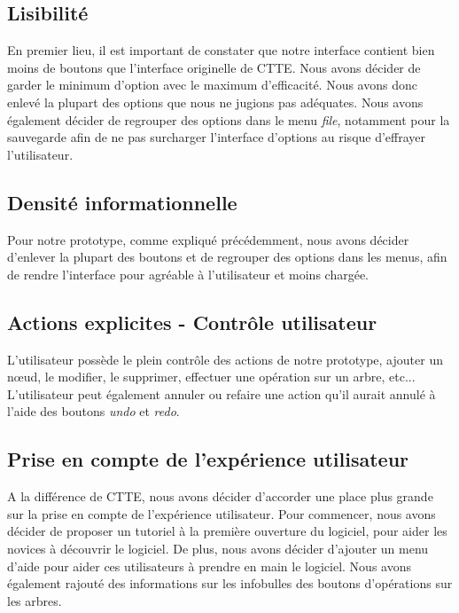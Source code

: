\documentclass[12pt, a4paper]{article}
\begin{document}
\textcolor{NavyBlue}{\subsection{Lisibilité}}

En premier lieu, il est important de constater que notre interface contient bien moins de boutons que l'interface originelle de CTTE. Nous avons décider de garder le minimum d'option avec le maximum d'efficacité. Nous avons donc enlevé la plupart des options que nous ne jugions pas adéquates. Nous avons également décider de regrouper des options dans le menu \emph{file}, notamment pour la sauvegarde afin de ne pas surcharger l'interface d'options au risque d'effrayer l'utilisateur.

\textcolor{NavyBlue}{\subsection{Densité informationnelle}}

Pour notre prototype, comme expliqué précédemment, nous avons décider d'enlever la plupart des boutons et de regrouper des options dans les menus, afin de rendre l'interface pour agréable à l'utilisateur et moins chargée.

\textcolor{NavyBlue}{\subsection{Actions explicites - Contrôle utilisateur}}

L'utilisateur possède le plein contrôle des actions de notre prototype, ajouter un nœud, le modifier, le supprimer, effectuer une opération sur un arbre, etc... L'utilisateur peut également annuler ou refaire une action qu'il aurait annulé à l'aide des boutons \emph{undo} et \emph{redo}.

\textcolor{NavyBlue}{\subsection{Prise en compte de l'expérience utilisateur}}

A la différence de CTTE, nous avons décider d'accorder une place plus grande sur la prise en compte de l'expérience utilisateur. Pour commencer, nous avons décider de proposer un tutoriel à la première ouverture du logiciel, pour aider les novices à découvrir le logiciel. De plus, nous avons décider d'ajouter un menu d'aide pour aider ces utilisateurs à prendre en main le logiciel. Nous avons également rajouté des informations sur les infobulles des boutons d'opérations sur les arbres.\\
\end{document}
